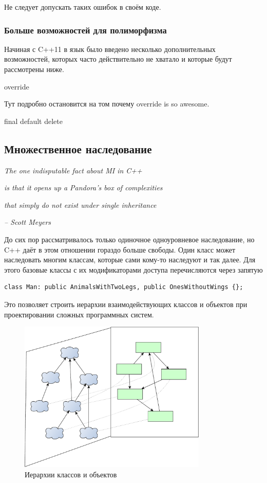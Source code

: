 \documentclass[a4paper,12pt,oneside]{article}
\begin{document}
Не следует допускать таких ошибок в своём коде.

\subsubsection{Больше возможностей для полиморфизма}\label{NewVirtual}

Начиная с C++11 в язык было введено несколько дополнительных возможностей, которых часто действительно не хватало и которые будут рассмотрены ниже.

override

Тут подробно остановится на том почему override is so awesome.

final
default
delete

\pagebreak
\subsection{Множественное наследование}\label{MultipleInheritance}

\hfill\textit{The one indisputable fact about MI in C++}

\hfill\textit{is that it opens up a Pandora's box of complexities}

\hfill\textit{that simply do not exist under single inheritance}{\vspace{0.5em}}

\hfill\textit{-- Scott Meyers}

До сих пор рассматривалось только одиночное одноуровневое наследование, но C++ даёт в этом отношении гораздо больше свободы. Один класс может наследовать многим классам, которые сами кому-то наследуют и так далее. Для этого базовые классы с их модификаторами доступа перечисляются через запятую

\begin{lstlisting}
class Man: public AnimalsWithTwoLegs, public OnesWithoutWings {};
\end{lstlisting}

Это позволяет строить иерархии взаимодействующих классов и объектов при проектировании сложных программных систем.

\begin{figure}[h!]
\centering
\includegraphics[width=0.8\textwidth]{illustrations/hierarchies-crop.pdf}
\caption{Иерархии классов и объектов}
\label{fig:hierarchies-crop}
\end{figure}
\end{document}
